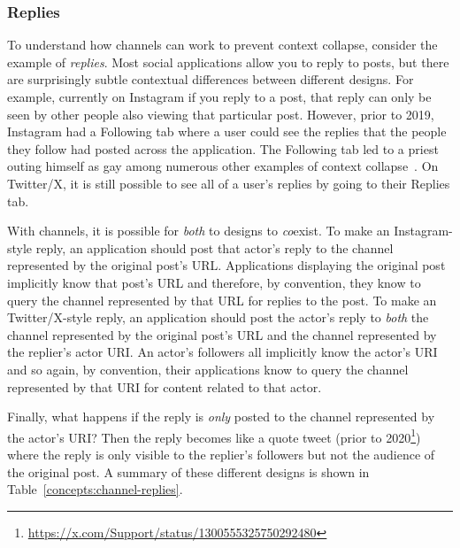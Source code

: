 

\subsubsection{Replies}

To understand how channels can work to prevent context collapse, consider the example of \emph{replies}.
Most social applications allow you to reply to posts, but there are surprisingly subtle
contextual differences between different designs.
For example, currently on Instagram
if you reply to a post, that reply can only be seen by other
people also viewing that particular post.
However, prior to 2019, Instagram had a Following tab where a user could see
the replies that the people they follow had posted across the application.
The Following tab led to a priest outing himself as gay among numerous other
examples of context collapse~\cite{instagramfollowingtab}.
On Twitter/X, it is still possible to see all of a user's replies by going
to their Replies tab.

With channels, it is possible for \emph{both} to designs to \emph{co}exist.
To make an Instagram-style reply,
an application should post that actor's reply to the channel
represented by the original post's URL.
Applications displaying the original post implicitly know that post's
URL and therefore,
by convention, they know to query the channel represented by that URL
for replies to the post.
To make an Twitter/X-style reply, an application should post the
actor's reply to \emph{both} the channel represented by the original post's URL
and the channel represented by the replier's actor URI.
An actor's followers all implicitly know the actor's URI and so
again, by convention, their applications know to query the channel represented by that URI
for content related to that actor.

Finally, what happens if the reply is \emph{only} posted to the
channel represented by the actor's URI?
Then the reply becomes like a quote tweet
(prior to 2020\footnote{
    \url{https://x.com/Support/status/1300555325750292480}
})
where the reply is only visible to the replier's followers but
not the audience of the original post.
A summary of these different designs is shown in Table~\ref{concepts:channel-replies}.

